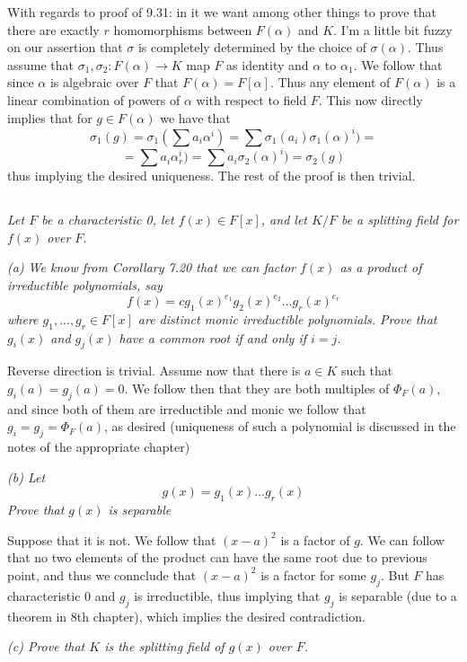 \documentclass[11pt,oneside,titlepage]{book}
\begin{document}
With regards to proof of 9.31: in it we want among other things to
prove that there are exactly $r$ homomorphisms between $F(\alpha)$ and
$K$. I'm a little bit fuzzy on our assertion that $\sigma$ is
completely determined by the choice of $\sigma(\alpha)$. Thus assume
that $\sigma_1, \sigma_2: F(\alpha) \to K$ map $F$ as identity and
$\alpha$ to $\alpha_1$. We follow that since $\alpha$ is algebraic
over $F$ that $F(\alpha) = F[\alpha]$. Thus any element of $F(\alpha)$
is a linear combination of powers of $\alpha$ with respect to field
$F$.  This now directly implies that for $g \in F(\alpha)$ we have
that
$$\sigma_1(g) = \sigma_1(\sum{a_i \alpha^i}) = \sum{\sigma_1(a_i) \sigma_1(\alpha)^i}) =$$
$$ = \sum{a_i \alpha_r^i}) = \sum{a_i \sigma_2(\alpha)^i}) = \sigma_2(g)$$
thus implying the desired uniqueness. The rest of the proof is then
trivial.

\subsection{}

\textit{Let $F$ be a characteristic 0, let $f(x) \in F[x]$, and let
$K/F$ be a splitting field for $f(x)$ over $F$.}

\textit{(a) We know from Corollary 7.20 that we can factor $f(x)$ as a
  product of irreductible polynomials, say
  $$f(x) = c g_1(x)^{e_1} g_2(x)^{e_2} ... g_r(x)^{e_r}$$
  where $g_1, ..., g_r \in F[x]$ are distinct monic irreductible
  polynomials. Prove that $g_i(x)$ and $g_j(x)$ have a common root if
  and only if $i = j$. }

Reverse direction is trivial. Assume now that there is $a \in K$ such
that $g_i(a) = g_j(a) = 0$. We follow then that they are both
multiples of $\Phi_F(a)$, and since both of them are irreductible and
monic we follow that $g_i = g_j = \Phi_F(a)$, as desired (uniqueness
of such a polynomial is discussed in the notes of the appropriate
chapter)

\textit{(b) Let
  $$g(x) = g_1(x) ... g_r(x)$$
  Prove that $g(x)$ is separable}

Suppose that it is not. We follow that $(x - a)^2$ is a factor of $g$.
We can follow that no two elements of the product can have the
same root due to previous point, and thus we connclude that
$(x - a)^2$ is a factor for some $g_j$. But $F$ has characteristic 0
and $g_j$ is irreductible, thus implying that $g_j$ is separable (due
to a theorem in 8th chapter), which implies the desired contradiction.

\textit{(c) Prove that $K$ is the splitting field of $g(x)$ over $F$.}
\end{document}
